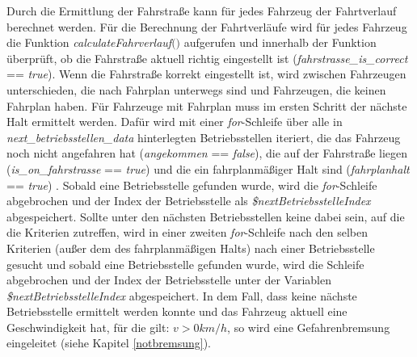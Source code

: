 Durch die Ermittlung der Fahrstraße kann für jedes Fahrzeug der Fahrtverlauf berechnet werden. Für die Berechnung der Fahrtverläufe wird für jedes Fahrzeug die Funktion \textit{calculateFahrverlauf$($$)$} aufgerufen und innerhalb der Funktion überprüft, ob die Fahrstraße aktuell richtig eingestellt ist (\textit{fahrstrasse\_is\_correct} == \textit{true}). Wenn die Fahrstraße korrekt eingestellt ist, wird zwischen Fahrzeugen unterschieden, die nach Fahrplan unterwegs sind und Fahrzeugen, die keinen Fahrplan haben. Für Fahrzeuge mit Fahrplan muss im ersten Schritt der nächste Halt ermittelt werden. Dafür wird mit einer \textit{for}-Schleife über alle in \textit{next\_betriebsstellen\_data} hinterlegten Betriebsstellen iteriert, die das Fahrzeug noch nicht angefahren hat (\textit{angekommen} == \textit{false}), die auf der Fahrstraße liegen (\textit{is\_on\_fahrstrasse} == \textit{true}) und die ein fahrplanmäßiger Halt sind (\textit{fahrplanhalt} == \textit{true}) . Sobald eine Betriebsstelle gefunden wurde, wird die \textit{for}-Schleife abgebrochen und der Index der Betriebsstelle als \textit{\$nextBetriebsstelleIndex} abgespeichert. Sollte unter den nächsten Betriebsstellen keine dabei sein, auf die die Kriterien zutreffen, wird in einer zweiten \textit{for}-Schleife nach den selben Kriterien (außer dem des fahrplanmäßigen Halts) nach einer Betriebsstelle gesucht und sobald eine Betriebsstelle gefunden wurde, wird die Schleife abgebrochen und der Index der Betriebsstelle unter der Variablen \textit{\$nextBetriebsstelleIndex} abgespeichert. In dem Fall, dass keine nächste Betriebsstelle ermittelt werden konnte und das Fahrzeug aktuell eine Geschwindigkeit hat, für die gilt: $v>0km/h$, so wird eine Gefahrenbremsung eingeleitet (siehe Kapitel \ref{notbremsung}). 

